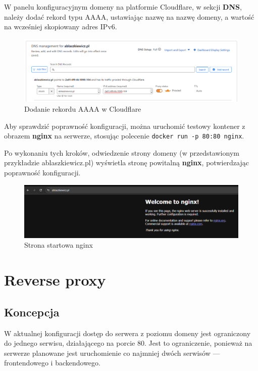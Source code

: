 \documentclass{article}
\begin{document}
W panelu konfiguracyjnym domeny na platformie Cloudflare, w sekcji \textbf{DNS}, należy dodać rekord typu AAAA, ustawiając nazwę na nazwę domeny, a wartość na wcześniej skopiowany adres IPv6.

\begin{figure}[H]
    \centering
    \includegraphics[width=1\linewidth]{ipv6cloudflare.png}
    \caption{Dodanie rekordu AAAA w Cloudflare}
    \label{fig:enter-label}
\end{figure}

Aby sprawdzić poprawność konfiguracji, można uruchomić testowy kontener z obrazem \textbf{nginx} na serwerze, stosując polecenie \lstinline|docker run -p 80:80 nginx|.


Po wykonaniu tych kroków, odwiedzenie strony domeny (w przedstawionym przykładzie ablaszkiewicz.pl) wyświetla stronę powitalną \textbf{nginx}, potwierdzając poprawność konfiguracji.

\begin{figure}[H]
    \centering
    \includegraphics[width=1\linewidth]{ipv6helloWorld.png}
    \caption{Strona startowa nginx}
    \label{fig:enter-label}
\end{figure}


\section{Reverse proxy}

\subsection{Koncepcja}

W aktualnej konfiguracji dostęp do serwera z poziomu domeny jest ograniczony do jednego serwisu, działającego na porcie 80. Jest to ograniczenie, ponieważ na serwerze planowane jest uruchomienie co najmniej dwóch serwisów — frontendowego i backendowego.
\end{document}
